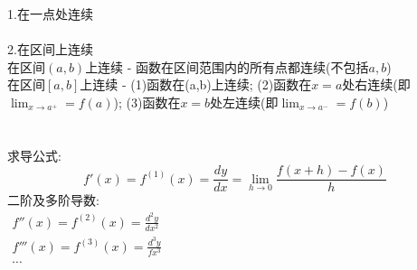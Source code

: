 \documentclass[UFT8, fontset=ubuntu]{ctexart}
\begin{document}
1.在一点处连续\\[1ex]
\\[4ex]
2.在区间上连续\\
在区间$(a,b)$上连续 - 函数在区间范围内的所有点都连续(不包括$a,b$)\\
在区间$[a,b]$上连续 - (1)函数在(a,b)上连续; (2)函数在$x=a$处右连续(即$\lim_{x\to a^+}=f(a)$); (3)函数在$x=b$处左连续(即$\lim_{x\to a^-}=f(b)$)\\[4ex]
\\[4ex]
\\[4ex]
求导公式:
\[f'(x)=f^{(1)}(x)=\frac{dy}{dx}=\lim_{h\to 0}\frac{f(x+h)-f(x)}{h}\]
二阶及多阶导数:\\
\begin{math}
\begin{array}{l}
	\displaystyle f''(x)=f^{(2)}(x)=\frac{d^2y}{dx^2}\\[2ex]
	\displaystyle f'''(x)=f^{(3)}(x)=\frac{d^3y}{fx^3}\\[2ex]
	\cdots
\end{array}
\end{math}\\[2ex]
\end{document}
